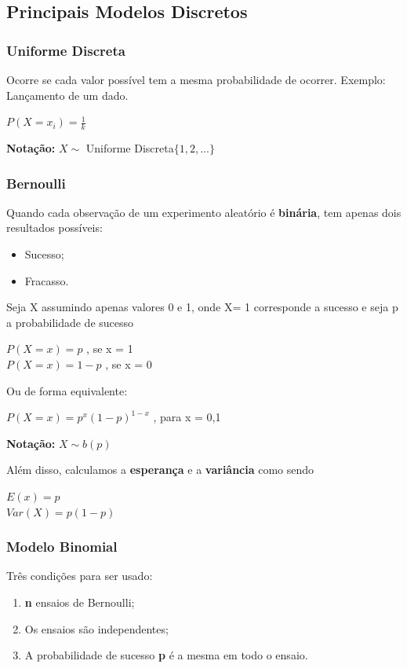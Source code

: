 \documentclass[a4paper, 12pt]{article}
\begin{document}
\subsection{Principais Modelos Discretos}
\subsubsection{Uniforme Discreta}
	Ocorre se cada valor possível tem a mesma probabilidade de ocorrer. Exemplo: Lançamento de um dado.
	\begin{center}
		\LARGE
		$P(X=x_{i}) = \frac{1}{k}$ 
	\end{center}
	\textbf{Notação:} $X\sim$ Uniforme Discreta$\{1, 2, ...\}$
	
\subsubsection{Bernoulli}
	Quando cada observação de um experimento aleatório é \textbf{binária}, tem apenas dois resultados possíveis:
	\begin{itemize}
		\item Sucesso;
		\item Fracasso.
	\end{itemize}
	Seja X assumindo apenas valores 0 e 1, onde X= 1 corresponde a sucesso e seja p a probabilidade de sucesso
	\begin{center}
		\LARGE
		$P(X = x) = p$ , se x = 1\\
		$P(X = x) = 1 - p$ , se x = 0
	\end{center}
	Ou de forma equivalente:
	\begin{center}
		\LARGE
		$P(X = x) = p^{x}(1-p)^{1-x}$ , para x = 0,1
	\end{center}
	\textbf{Notação:} $X \sim b(p)$
	
	Além disso, calculamos a \textbf{esperança} e a \textbf{variância} como sendo
	\begin{center}
		\LARGE
		$E(x) = p$\\ $Var(X) = p(1-p)$
	\end{center}
	
\subsubsection{Modelo Binomial}
	Três condições para ser usado:
	\begin{enumerate}
		\item \textbf{n} ensaios de Bernoulli;
		\item Os ensaios são independentes;
		\item A probabilidade de sucesso \textbf{p} é a mesma em todo o ensaio.
	\end{enumerate}	
	
\end{document}
